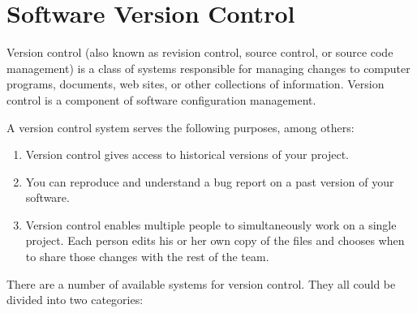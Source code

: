 
\chapter{Software Version Control}
Version control (also known as revision control,
source control, or source code management) is a class of systems
responsible for managing changes to computer programs, documents,
web sites, or other collections of information. Version control is a
component of software configuration management.\\

\vspace{3mm}

A version control system serves the following purposes, among others:
\begin{enumerate}
\item Version control gives access to historical versions of your project.
\item You can reproduce and understand a bug report on a
past version of your software.
\item Version control enables multiple people to simultaneously
work on a single project. Each person edits his or her own copy
of the files and chooses when to share those changes with the
rest of the team.
\end{enumerate}
\ifslides
\newpage
\fi
There are a number of available systems for version control. They all could
be divided into two categories:
